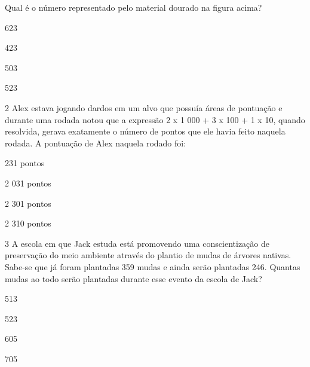 Qual é o número representado pelo material dourado na figura acima?

\begin{escolha}
\item
  623
\item
  423
\item
  503
\item
  523
\end{escolha}


\num{2} Alex estava jogando dardos em um alvo que possuía áreas de
pontuação e durante uma rodada notou que a expressão 2 x 1 000 + 3 x 100
+ 1 x 10, quando resolvida, gerava exatamente o número de pontos que ele
havia feito naquela rodada. A pontuação de Alex naquela rodado foi:

\begin{escolha}
\item
  231 pontos
\item
  2 031 pontos
\item
  2 301 pontos
\item
  2 310 pontos
\end{escolha}


\num{3} A escola em que Jack estuda está promovendo uma conscientização de
preservação do meio ambiente através do plantio de mudas de árvores
nativas. Sabe-se que já foram plantadas 359 mudas e ainda serão
plantadas 246. Quantas mudas ao todo serão plantadas durante esse evento
da escola de Jack?

\begin{escolha}
\item
  513
\item
  523
\item
  605
\item
  705
\end{escolha}


